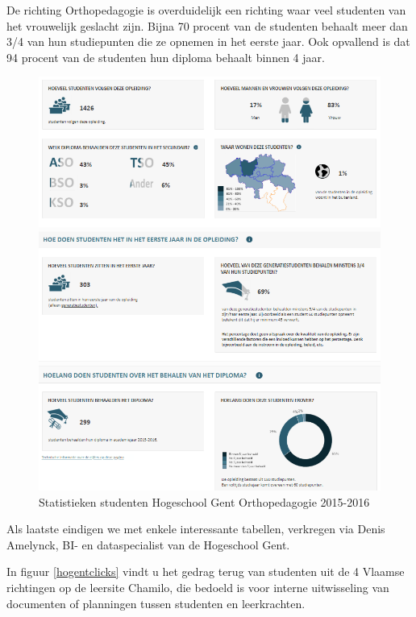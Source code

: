 De richting Orthopedagogie is overduidelijk een richting waar veel studenten van het vrouwelijk geslacht zijn. Bijna 70 procent van de studenten behaalt meer dan 3/4 van hun studiepunten die ze opnemen in het eerste jaar. Ook opvallend is dat 94 procent van de studenten hun diploma behaalt binnen 4 jaar.

\begin{figure}
	\includegraphics[width=\textwidth]
	{img/vlaanderen_or.png}
	\caption{Statistieken studenten Hogeschool Gent Orthopedagogie 2015-2016
		\autocite{Onderwijs.vlaanderen.be2017}}
	\label{fig:vlaanderenor}
\end{figure}


Als laatste eindigen we met enkele interessante tabellen, verkregen via Denis Amelynck, BI- en dataspecialist van de Hogeschool Gent. 

In figuur \ref{hogentclicks} vindt u het gedrag terug van studenten uit de 4 Vlaamse richtingen op de leersite Chamilo, die bedoeld is voor interne uitwisseling van documenten of planningen tussen studenten en leerkrachten.


